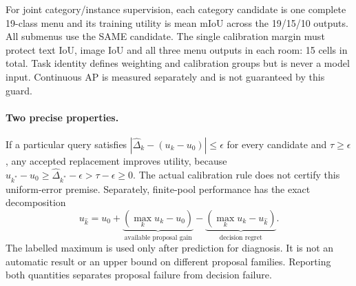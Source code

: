 For joint category/instance supervision, each category candidate is one complete
19-class menu and its training utility is mean mIoU across the 19/15/10 outputs.
All submenus use the SAME candidate. The single calibration margin must protect
text IoU, image IoU and all three menu outputs in each room: 15 cells in total.
Task identity defines weighting and calibration groups but is never a model
input. Continuous AP is measured separately and is not guaranteed by this guard.

\paragraph{Two precise properties.}
If a particular query satisfies
$|\widehat\Delta_k-(u_k-u_0)|\leq\epsilon$ for every candidate and
$\tau\geq\epsilon$, any accepted replacement improves utility, because
$u_{k^*}-u_0\geq\widehat\Delta_{k^*}-\epsilon>\tau-\epsilon\geq0$.
The actual calibration rule does not certify this uniform-error premise.
Separately, finite-pool performance has the exact decomposition
\[
 u_{\hat k}=u_0+
 \underbrace{(\max_k u_k-u_0)}_{\text{available proposal gain}}-
 \underbrace{(\max_k u_k-u_{\hat k})}_{\text{decision regret}}.
\]
The labelled maximum is used only after prediction for diagnosis. It is not an
automatic result or an upper bound on different proposal families. Reporting
both quantities separates proposal failure from decision failure.
